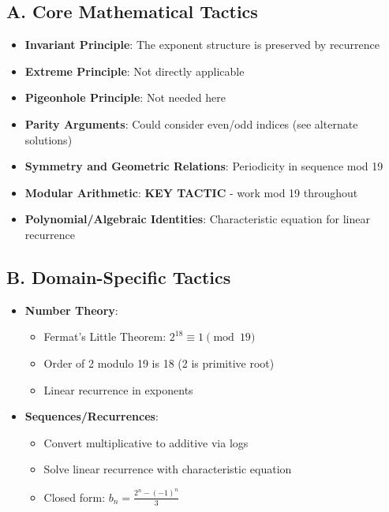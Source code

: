 \documentclass[11pt]{article}
\begin{document}
\begin{tacticalbox}
\subsection*{A. Core Mathematical Tactics}
\begin{itemize}[leftmargin=*]
    \item \textbf{Invariant Principle}: The exponent structure is preserved by recurrence
    
    \item \textbf{Extreme Principle}: Not directly applicable
    
    \item \textbf{Pigeonhole Principle}: Not needed here
    
    \item \textbf{Parity Arguments}: Could consider even/odd indices (see alternate solutions)
    
    \item \textbf{Symmetry and Geometric Relations}: Periodicity in sequence mod 19
    
    \item \textbf{Modular Arithmetic}: \textbf{KEY TACTIC} - work mod 19 throughout
    
    \item \textbf{Polynomial/Algebraic Identities}: Characteristic equation for linear recurrence
\end{itemize}

\subsection*{B. Domain-Specific Tactics}
\begin{itemize}[leftmargin=*]
    \item \textbf{Number Theory}: 
    \begin{itemize}
        \item Fermat's Little Theorem: $2^{18} \equiv 1 \pmod{19}$
        \item Order of 2 modulo 19 is 18 (2 is primitive root)
        \item Linear recurrence in exponents
    \end{itemize}
    
    \item \textbf{Sequences/Recurrences}:
    \begin{itemize}
        \item Convert multiplicative to additive via logs
        \item Solve linear recurrence with characteristic equation
        \item Closed form: $b_n = \frac{2^n - (-1)^n}{3}$
    \end{itemize}
\end{itemize}


\end{tacticalbox}
\end{document}
